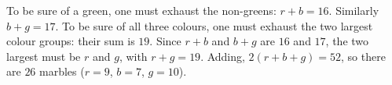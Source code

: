 To be sure of a green, one must exhaust the non-greens: $r+b=16$. Similarly $b+g=17$. To be sure of all three colours, one must exhaust the two largest colour groups: their sum is $19$. Since $r+b$ and $b+g$ are $16$ and $17$, the two largest must be $r$ and $g$, with $r+g=19$. Adding, $2(r+b+g)=52$, so there are $\boxed{26}$ marbles ($r=9$, $b=7$, $g=10$).
